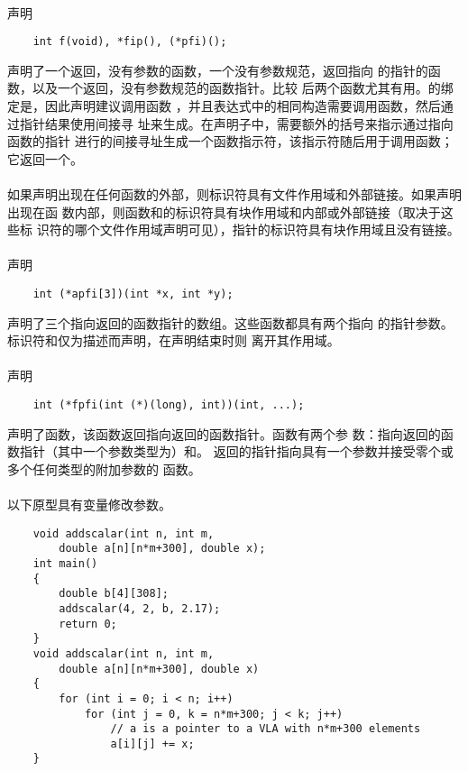 {\paragraph{}
\ex 声明
\begin{lstlisting}
    int f(void), *fip(), (*pfi)();
\end{lstlisting}
声明了一个返回，没有参数的函数，一个没有参数规范，返回指向
的指针的函数，以及一个返回，没有参数规范的函数指针。比较
后两个函数尤其有用。的绑定是，因此声明建议调用函数
，并且表达式中的相同构造需要调用函数，然后通过指针结果使用间接寻
址来生成。在声明子中，需要额外的括号来指示通过指向函数的指针
进行的间接寻址生成一个函数指示符，该指示符随后用于调用函数；它返回一个。

\paragraph{}
如果声明出现在任何函数的外部，则标识符具有文件作用域和外部链接。如果声明出现在函
数内部，则函数和的标识符具有块作用域和内部或外部链接（取决于这些标
识符的哪个文件作用域声明可见），指针的标识符具有块作用域且没有链接。

\paragraph{}
\ex 声明
\begin{lstlisting}
    int (*apfi[3])(int *x, int *y);
\end{lstlisting}
声明了三个指向返回的函数指针的数组。这些函数都具有两个指向
的指针参数。标识符和仅为描述而声明，在声明结束时则
离开其作用域。

\paragraph{}
\ex 声明
\begin{lstlisting}
    int (*fpfi(int (*)(long), int))(int, ...);
\end{lstlisting}
声明了函数，该函数返回指向返回的函数指针。函数有两个参
数：指向返回的函数指针（其中一个参数类型为）和。
返回的指针指向具有一个参数并接受零个或多个任何类型的附加参数的
函数。

\paragraph{}
\ex 以下原型具有变量修改参数。
\begin{lstlisting}
    void addscalar(int n, int m,
        double a[n][n*m+300], double x);
    int main()
    {
        double b[4][308];
        addscalar(4, 2, b, 2.17);
        return 0;
    }
    void addscalar(int n, int m,
        double a[n][n*m+300], double x)
    {
        for (int i = 0; i < n; i++)
            for (int j = 0, k = n*m+300; j < k; j++)
                // a is a pointer to a VLA with n*m+300 elements
                a[i][j] += x;
    }
\end{lstlisting}

}
